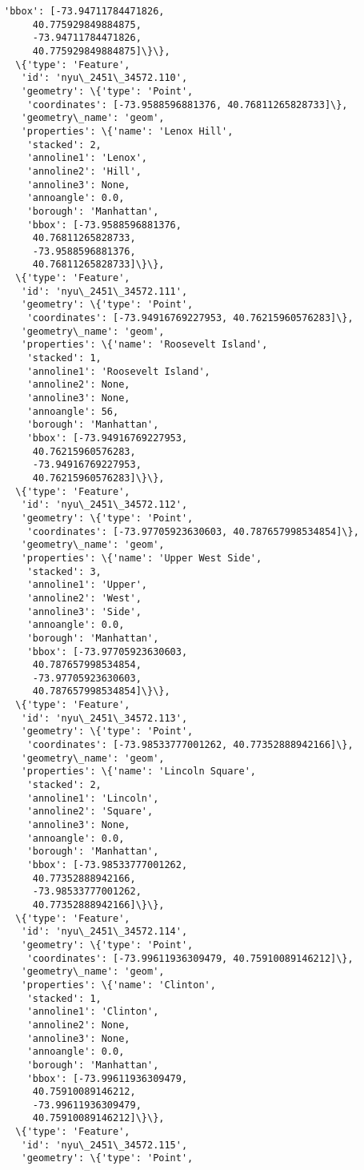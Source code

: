 \documentclass[11pt]{article}
\begin{document}
\begin{tcolorbox}[breakable, size=fbox, boxrule=.5pt, pad at break*=1mm, opacityfill=0]
\begin{Verbatim}[commandchars=\\\{\}]
    'bbox': [-73.94711784471826,
     40.775929849884875,
     -73.94711784471826,
     40.775929849884875]\}\},
  \{'type': 'Feature',
   'id': 'nyu\_2451\_34572.110',
   'geometry': \{'type': 'Point',
    'coordinates': [-73.9588596881376, 40.76811265828733]\},
   'geometry\_name': 'geom',
   'properties': \{'name': 'Lenox Hill',
    'stacked': 2,
    'annoline1': 'Lenox',
    'annoline2': 'Hill',
    'annoline3': None,
    'annoangle': 0.0,
    'borough': 'Manhattan',
    'bbox': [-73.9588596881376,
     40.76811265828733,
     -73.9588596881376,
     40.76811265828733]\}\},
  \{'type': 'Feature',
   'id': 'nyu\_2451\_34572.111',
   'geometry': \{'type': 'Point',
    'coordinates': [-73.94916769227953, 40.76215960576283]\},
   'geometry\_name': 'geom',
   'properties': \{'name': 'Roosevelt Island',
    'stacked': 1,
    'annoline1': 'Roosevelt Island',
    'annoline2': None,
    'annoline3': None,
    'annoangle': 56,
    'borough': 'Manhattan',
    'bbox': [-73.94916769227953,
     40.76215960576283,
     -73.94916769227953,
     40.76215960576283]\}\},
  \{'type': 'Feature',
   'id': 'nyu\_2451\_34572.112',
   'geometry': \{'type': 'Point',
    'coordinates': [-73.97705923630603, 40.787657998534854]\},
   'geometry\_name': 'geom',
   'properties': \{'name': 'Upper West Side',
    'stacked': 3,
    'annoline1': 'Upper',
    'annoline2': 'West',
    'annoline3': 'Side',
    'annoangle': 0.0,
    'borough': 'Manhattan',
    'bbox': [-73.97705923630603,
     40.787657998534854,
     -73.97705923630603,
     40.787657998534854]\}\},
  \{'type': 'Feature',
   'id': 'nyu\_2451\_34572.113',
   'geometry': \{'type': 'Point',
    'coordinates': [-73.98533777001262, 40.77352888942166]\},
   'geometry\_name': 'geom',
   'properties': \{'name': 'Lincoln Square',
    'stacked': 2,
    'annoline1': 'Lincoln',
    'annoline2': 'Square',
    'annoline3': None,
    'annoangle': 0.0,
    'borough': 'Manhattan',
    'bbox': [-73.98533777001262,
     40.77352888942166,
     -73.98533777001262,
     40.77352888942166]\}\},
  \{'type': 'Feature',
   'id': 'nyu\_2451\_34572.114',
   'geometry': \{'type': 'Point',
    'coordinates': [-73.99611936309479, 40.75910089146212]\},
   'geometry\_name': 'geom',
   'properties': \{'name': 'Clinton',
    'stacked': 1,
    'annoline1': 'Clinton',
    'annoline2': None,
    'annoline3': None,
    'annoangle': 0.0,
    'borough': 'Manhattan',
    'bbox': [-73.99611936309479,
     40.75910089146212,
     -73.99611936309479,
     40.75910089146212]\}\},
  \{'type': 'Feature',
   'id': 'nyu\_2451\_34572.115',
   'geometry': \{'type': 'Point',

\end{Verbatim}
\end{tcolorbox}
\end{document}
